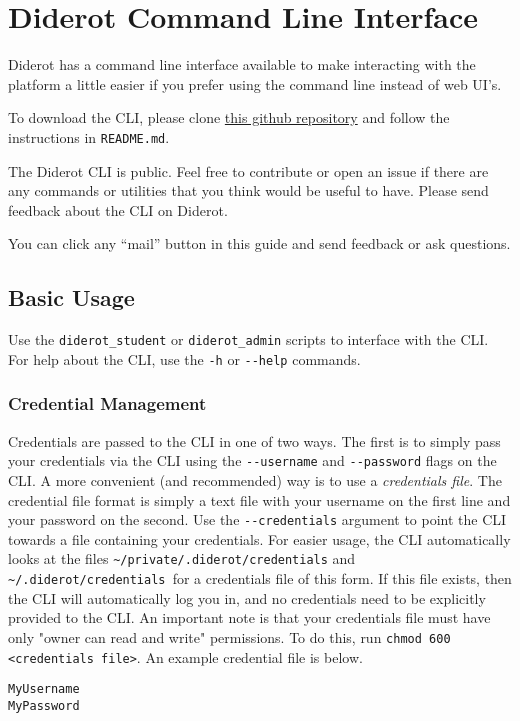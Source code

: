 \chapter{Diderot Command Line Interface}

Diderot has a command line interface available to make interacting
with the platform a little easier if you prefer using the command
line instead of web UI's.

\begin{important}


To download the CLI, please clone 
%
\href{https://github.com/diderot-edu/diderot-cli}{this github repository}
%
and follow the instructions in \lstinline`README.md`. 

The Diderot CLI is public. Feel free to contribute or open an issue if there
are any commands or utilities that you think would be useful to have. Please
send feedback about the CLI on Diderot.
\end{important}

\begin{note}
You can click any ``mail''  button in this guide and send feedback or ask questions. 
\end{note}

\section{Basic Usage}

Use the \verb|diderot_student| or \verb|diderot_admin| scripts to interface with the CLI.
%
For help about the CLI, use the \verb|-h| or \verb|--help| commands.

\subsection{Credential Management}
Credentials are passed to the CLI in one of two ways. 
%
The first is to simply pass your credentials via the CLI using the \verb|--username| and \verb|--password| flags on the CLI. 
%
A more convenient (and recommended) way is to use a \emph{credentials file}.
%
The credential file format is simply a text file with your username on the first line and your password on the second. 
%
Use the \verb|--credentials| argument to point the CLI towards a file containing your credentials.
%
For easier usage, the CLI automatically looks at the files \verb|~/private/.diderot/credentials| and \verb|~/.diderot/credentials |for a credentials file of this form. 
%
If this file exists, then the CLI will automatically log you in, and no credentials need to be explicitly provided to the CLI.
%
An important note is that your credentials file must have only "owner can read and write" permissions. To do this, run \verb|chmod 600 <credentials file>|.
%
An example credential file is below.
\begin{verbatim}
MyUsername
MyPassword
\end{verbatim}

